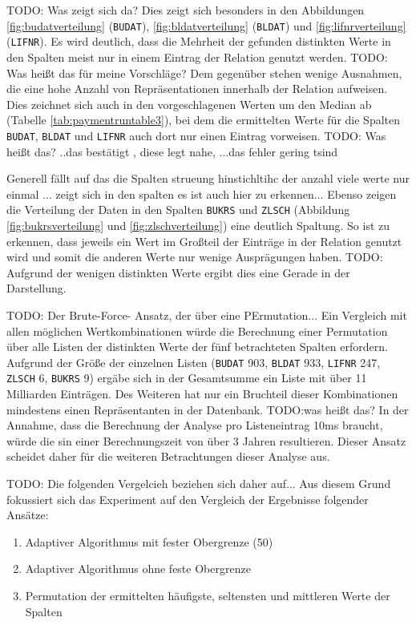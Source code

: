 TODO: Was zeigt sich da?
Dies zeigt sich besonders in den Abbildungen \ref{fig:budatverteilung} (\texttt{BUDAT}), \ref{fig:bldatverteilung} (\texttt{BLDAT}) und \ref{fig:lifnrverteilung} (\texttt{LIFNR}).
Es wird deutlich, dass die Mehrheit der gefunden distinkten Werte in den Spalten meist nur in einem Eintrag der Relation genutzt werden.
TODO: Was heißt das für meine Vorschläge?
Dem gegenüber stehen wenige Ausnahmen, die eine hohe Anzahl von Repräsentationen innerhalb der Relation aufweisen.
Dies zeichnet sich auch in den vorgeschlagenen Werten um den Median ab (Tabelle \ref{tab:paymentruntable3}), bei dem die ermittelten Werte für die Spalten \texttt{BUDAT}, \texttt{BLDAT} und \texttt{LIFNR} auch dort nur einen Eintrag vorweisen.
TODO: Was heißt das? ..das bestätigt , diese legt nahe, ...das fehler gering tsind

Generell fällt auf  das die Spalten strueung hinstichltihc der anzahl 
viele werte nur einmal ...
zeigt sich in den spalten
es ist auch hier zu erkennen...
Ebenso zeigen die Verteilung der Daten in den Spalten \texttt{BUKRS} und \texttt{ZLSCH} (Abbildung \ref{fig:bukrsverteilung} und \ref{fig:zlschverteilung}) eine deutlich Spaltung.
So ist zu erkennen, dass jeweils ein Wert im Großteil der Einträge in der Relation genutzt wird und somit die anderen Werte nur wenige Ausprägungen haben.
TODO: Aufgrund der wenigen distinkten Werte ergibt dies eine Gerade in der Darstellung.

TODO: Der Brute-Force- Ansatz, der über eine PErmutation...
Ein Vergleich mit allen möglichen Wertkombinationen würde die Berechnung einer Permutation über alle Listen der distinkten Werte der fünf betrachteten Spalten erfordern.
Aufgrund der Größe der einzelnen Listen (\texttt{BUDAT} 903, \texttt{BLDAT} 933, \texttt{LIFNR} 247, \texttt{ZLSCH} 6, \texttt{BUKRS} 9) ergäbe sich in der Gesamtsumme ein Liste mit über 11 Milliarden Einträgen.
Des Weiteren hat nur ein Bruchteil dieser Kombinationen mindestens einen Repräsentanten in der Datenbank.
TODO:was heißt das?
In der Annahme, dass die Berechnung der Analyse pro Listeneintrag 10ms braucht, würde die sin einer Berechnungszeit von über 3 Jahren resultieren.
Dieser Ansatz scheidet daher für die weiteren Betrachtungen dieser Analyse aus.

TODO: Die folgenden Vergelcieh beziehen sich daher auf...
Aus diesem Grund fokussiert sich das Experiment auf den Vergleich der Ergebnisse folgender Ansätze:

   \begin{enumerate}
      \item Adaptiver Algorithmus mit fester Obergrenze (50)
      \item Adaptiver Algorithmus ohne feste Obergrenze
			\item Permutation der ermittelten häufigste, seltensten und mittleren Werte der Spalten
   \end{enumerate}

